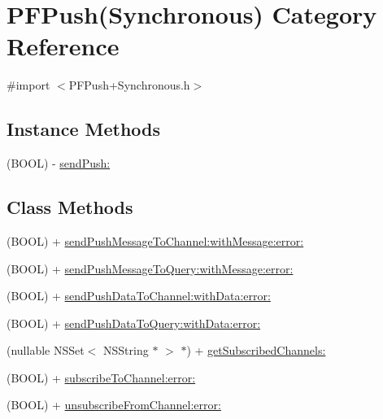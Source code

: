 \hypertarget{category_p_f_push_07_synchronous_08}{}\section{P\+F\+Push(Synchronous) Category Reference}
\label{category_p_f_push_07_synchronous_08}


{\ttfamily \#import $<$P\+F\+Push+\+Synchronous.\+h$>$}

\subsection*{Instance Methods}
\begin{DoxyCompactItemize}
\item 
(B\+O\+O\+L) -\/ \hyperlink{category_p_f_push_07_synchronous_08_aae95b13e47627b142da7af040a706336}{send\+Push\+:}
\begin{DoxyCompactList}\small\item\em 

 \end{DoxyCompactList}\end{DoxyCompactItemize}
\subsection*{Class Methods}
\begin{DoxyCompactItemize}
\item 
(B\+O\+O\+L) + \hyperlink{category_p_f_push_07_synchronous_08_a48fd26a782963ceaeeb2a71bd78abae1}{send\+Push\+Message\+To\+Channel\+:with\+Message\+:error\+:}
\item 
(B\+O\+O\+L) + \hyperlink{category_p_f_push_07_synchronous_08_a2924eb65b20afb36f08616103a17d507}{send\+Push\+Message\+To\+Query\+:with\+Message\+:error\+:}
\item 
(B\+O\+O\+L) + \hyperlink{category_p_f_push_07_synchronous_08_a7f611687ca4d933640975d5824148a62}{send\+Push\+Data\+To\+Channel\+:with\+Data\+:error\+:}
\item 
(B\+O\+O\+L) + \hyperlink{category_p_f_push_07_synchronous_08_a20913948872a62e33086b0a4662356f1}{send\+Push\+Data\+To\+Query\+:with\+Data\+:error\+:}
\item 
(nullable N\+S\+Set$<$ N\+S\+String $\ast$ $>$ $\ast$) + \hyperlink{category_p_f_push_07_synchronous_08_a9476931fbe549f6faed8124128f59824}{get\+Subscribed\+Channels\+:}
\begin{DoxyCompactList}\small\item\em 

 \end{DoxyCompactList}\item 
(B\+O\+O\+L) + \hyperlink{category_p_f_push_07_synchronous_08_a41a1a6849ce7bec9e9d146ecc4431b14}{subscribe\+To\+Channel\+:error\+:}
\item 
(B\+O\+O\+L) + \hyperlink{category_p_f_push_07_synchronous_08_a230f3966d7171601d544b5e2d1bd3ea5}{unsubscribe\+From\+Channel\+:error\+:}
\end{DoxyCompactItemize}


